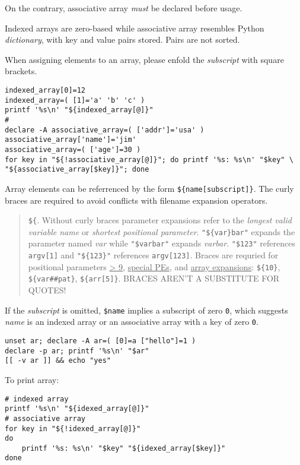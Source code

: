 On the contrary, associative array \textit{must} be
declared before usage.

Indexed arrays are zero-based while associative array resembles
Python \textit{dictionary}, with key and value pairs stored. Pairs
are not sorted.

When assigning elements to an array, please enfold the
\textit{subscript} with square brackets.

\begin{lstlisting}
indexed_array[0]=12
indexed_array=( [1]='a' 'b' 'c' )
printf '%s\n' "${indexed_array[@]}"
#
declare -A associative_array=( ['addr']='usa' )
associative_array['name']='jim'
associative_array=( ['age']=30 )
for key in "${!associative_array[@]}"; do printf '%s: %s\n' "$key" \
"${associative_array[$key]}"; done
\end{lstlisting}

Array elements can be referrenced by the form
\lstinline|${name[subscript]}|. The curly braces are required to
avoid conflicts with filename expansion operators.

\begin{quotation}
  \lstinline|${|. Without curly braces parameter expansions refer
    to the \textit{longest valid variable name} or
    \textit{shortest positional parameter}.
    \lstinline|"${var}bar"| expands the parameter named
    \textit{var} while \lstinline|"$varbar"| expands
    \textit{varbar}.
    \lstinline|"$123"| references \lstinline|argv[1]| and
    \lstinline|"${123}"| references \lstinline|argv[123]|. Braces
    are requried for positional parameters \uline{> 9},
    \uline{special PEs}, and \uline{array expansions}:
    \lstinline|${10}|, \lstinline|${var##pat}|,
    \lstinline|${arr[5]}|. BRACES AREN'T A SUBSTITUTE FOR QUOTES!
  \end{quotation}

If the \textit{subscript} is
omitted, \lstinline|$name| implies a subscript of zero \verb|0|,
which suggests \textit{name} is an indexed array or an associative
array with a key of zero \verb|0|.

\begin{lstlisting}
unset ar; declare -A ar=( [0]=a ["hello"]=1 )
declare -p ar; printf '%s\n' "$ar"
[[ -v ar ]] && echo "yes"
\end{lstlisting}

To print array:

\begin{lstlisting}
# indexed array
printf '%s\n' "${idexed_array[@]}"
# associative array
for key in "${!idexed_array[@]}"
do
    printf '%s: %s\n' "$key" "${idexed_array[$key]}"
done
\end{lstlisting}


